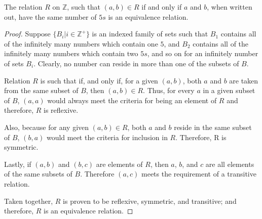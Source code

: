 
\begin{theorem}
  The relation $R$ on $\mathbb{Z}$, such that $(a,b)\in R$ if and only if $a$
  and $b$, when written out, have the same number of $5s$ is an equivalence
  relation.
\end{theorem}

\begin{proof}
  Suppose $\{B_i|i\in \mathbb{Z}^+\}$ is an indexed family of sets such that
  $B_1$ contains all of the infinitely many numbers which contain one $5$, and
  $B_2$ contains all of the infinitely many numbers which contain two $5s$,
  and so on for an infinitely number of sets $B_i$. Clearly, no number can
  reside in more than one of the subsets of $B$.

  Relation $R$ is such that if, and only if, for a given $(a,b)$, both $a$ and
  $b$ are taken from the same subset of $B$, then $(a,b) \in R$. Thus, for
  every $a$ in a given subset of $B$, $(a,a)$ would always meet the criteria
  for being an element of $R$ and therefore, $R$ is reflexive.

  Also, because for any given $(a,b) \in R$, both $a$ and $b$ reside in the same
  subset of $B$, $(b,a)$ would meet the criteria for inclusion in $R$.
  Therefore, R is symmetric.

  Lastly, if $(a,b)$ and $(b,c)$ are elements of $R$, then $a$, $b$, and $c$ are
  all elements of the same subsets of $B$. Therefore $(a,c)$ meets the
  requirement of a transitive relation.

  Taken together, $R$ is proven to be reflexive, symmetric, and transitive; and
  therefore, $R$ is an equivalence relation.
\end{proof}
